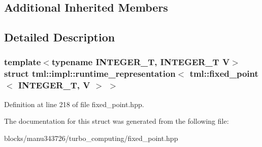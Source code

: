 \subsection*{Additional Inherited Members}


\subsection{Detailed Description}
\subsubsection*{template$<$typename I\+N\+T\+E\+G\+E\+R\+\_\+\+T, I\+N\+T\+E\+G\+E\+R\+\_\+\+T V$>$struct tml\+::impl\+::runtime\+\_\+representation$<$ tml\+::fixed\+\_\+point$<$ I\+N\+T\+E\+G\+E\+R\+\_\+\+T, V $>$ $>$}



Definition at line 218 of file fixed\+\_\+point.\+hpp.



The documentation for this struct was generated from the following file\+:\begin{DoxyCompactItemize}
\item 
blocks/manu343726/turbo\+\_\+computing/fixed\+\_\+point.\+hpp\end{DoxyCompactItemize}
